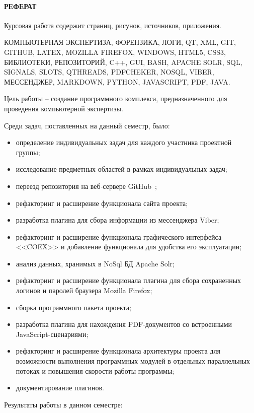 \newpage
{}
\paragraph{\hfill РЕФЕРАТ \hfill}
Курсовая работа содержит  страниц,  рисунок,  источников,  приложения.

КОМПЬЮТЕРНАЯ ЭКСПЕРТИЗА, ФОРЕНЗИКА, ЛОГИ, QT, XML, GIT, GITHUB, LATEX, MOZILLA FIREFOX, WINDOWS, HTML5, CSS3, БИБЛИОТЕКИ, РЕПОЗИТОРИЙ, C++, GUI, BASH, APACHE SOLR, SQL, SIGNALS, SLOTS, QTHREADS, PDFCHEKER, NOSQL, VIBER, МЕССЕНДЖЕР, MARKDOWN, PYTHON, JAVASCRIPT, PDF, JAVA. 

Цель работы -- создание программного комплекса, предназначенного для проведения компьютерной экспертизы.

Среди задач, поставленных на данный семестр, было: 
\begin{itemize}
  \item определение индивидуальных задач для каждого участника проектной группы;
  \item исследование предметных областей в рамках индивидуальных задач; 
  \item переезд репозитория на веб-сервере GitHub~\cite{github};
  \item рефакторинг и расширение функционала сайта проекта;
  \item разработка плагина для сбора информации из мессенджера Viber;
  \item рефакторинг и расширение функционала графического интерфейса <<COEX>> и добавление функционала для удобства его эксплуатации;
  \item анализ данных, хранимых в NoSql БД Apache Solr;
  \item рефакторинг и расширение функционала плагина для сбора сохраненных логинов и паролей браузера Mozilla Firefox;
  \item сборка программного пакета проекта;  
  \item разработка плагина для нахождения PDF-документов со встроенными JavaScript-сценариями;
  \item рефакторинг и расширение функционала архитектуры проекта для возможности выполнения программных модулей в отдельных параллельных потоках и повышения скорости работы программы;
  \item документирование плагинов.
\end{itemize}

Результаты работы в данном семестре:

